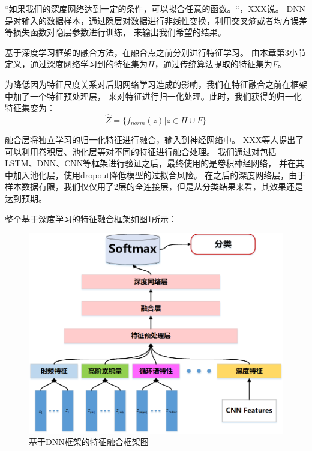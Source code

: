 “如果我们的深度网络达到一定的条件，可以拟合任意的函数。“，XXX说。
DNN是对输入的数据样本，通过隐层对数据进行非线性变换，利用交叉熵或者均方误差等损失函数对隐层参数进行训练，
来输出我们希望的结果。\par

基于深度学习框架的融合方法，在融合点之前分别进行特征学习。
由本章第3小节定义，通过深度网络学习到的特征集为$H$，通过传统算法提取的特征集为$F$。\par

为降低因为特征尺度关系对后期网络学习造成的影响，我们在特征融合之前在框架中加了一个特征预处理层，
来对特征进行归一化处理。此时，我们获得的归一化特征集变为：
\begin{equation}
	\label{eqt_4_23}
	\hat{Z} =\{ f_{norm}(z) | z \in H \cup F \}
\end{equation}

融合层将独立学习的归一化特征进行融合，输入到神经网络中。
XXX等人提出了可以利用卷积层、池化层等对不同的特征进行融合处理。
我们通过对包括LSTM、DNN、CNN等框架进行验证之后，最终使用的是卷积神经网络，
并在其中加入池化层，使用dropout降低模型的过拟合风险。
在之后的深度网络层，由于样本数据有限，我们仅仅用了2层的全连接层，但是从分类结果来看，其效果还是达到预期。\par


整个基于深度学习的特征融合框架如图\ref{sec:fig_4_3}所示：
\begin{figure}[!h]
	\centering
	\includegraphics[scale=0.55]{figures/chapter_4/fig_4_3}
	\caption{基于DNN框架的特征融合框架图}\label{sec:fig_4_3}
\end{figure}



